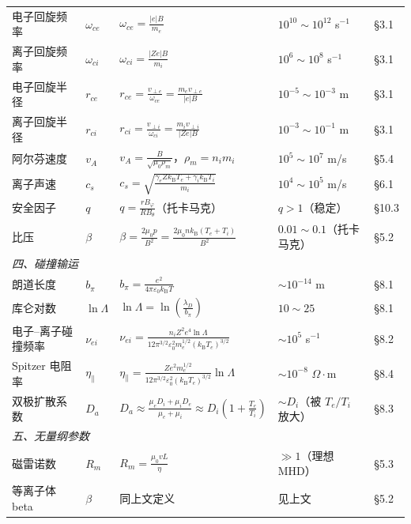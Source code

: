 \documentclass[12pt,a4paper,openany,oneside]{book}
\newcommand{\eps}{\varepsilon}
\begin{document}
{\begin{longtable}{@{}p{2.2cm}p{1.2cm}p{7.1cm}p{2.9cm}p{1.4cm}@{}}
\midrule
电子回旋频率 & $\omega_{ce}$ & $\displaystyle\omega_{ce} = \frac{|e|B}{m_e}$ & $10^{10}\sim10^{12}$ s$^{-1}$ & \S 3.1 \\
离子回旋频率 & $\omega_{ci}$ & $\displaystyle\omega_{ci} = \frac{|Ze|B}{m_i}$ & $10^{6}\sim10^{8}$ s$^{-1}$ & \S 3.1 \\
电子回旋半径 & $r_{ce}$ & $\displaystyle r_{ce} = \frac{v_{\perp e}}{\omega_{ce}} = \frac{m_e v_{\perp e}}{|e|B}$ & $10^{-5}\sim10^{-3}$ m & \S 3.1 \\
离子回旋半径 & $r_{ci}$ & $\displaystyle r_{ci} = \frac{v_{\perp i}}{\omega_{ci}} = \frac{m_i v_{\perp i}}{|Ze|B}$ & $10^{-3}\sim10^{-1}$ m & \S 3.1 \\
阿尔芬速度 & $v_A$ & $\displaystyle v_A = \frac{B}{\sqrt{\mu_0\rho_m}}$，$\rho_m=n_i m_i$ & $10^{5}\sim10^{7}$ m/s & \S 5.4 \\
离子声速 & $c_s$ & $\displaystyle c_s = \sqrt{\frac{\gamma_e Z k_\mathrm{B}T_e + \gamma_i k_\mathrm{B}T_i}{m_i}}$ & $10^{4}\sim10^{5}$ m/s & \S 6.1 \\
安全因子 & $q$ & $\displaystyle q = \frac{r B_\varphi}{R B_\theta}$（托卡马克）& $q>1$（稳定）& \S 10.3 \\
比压 & $\beta$ & $\displaystyle\beta = \frac{2\mu_0 p}{B^2} = \frac{2\mu_0 n k_\mathrm{B}(T_e+T_i)}{B^2}$ & $0.01\sim0.1$（托卡马克）& \S 5.2 \\
\midrule
\multicolumn{5}{l}{\textit{四、碰撞输运}} \\
\midrule
朗道长度 & $b_\pi$ & $\displaystyle b_\pi = \frac{e^2}{4\pi\eps_0 k_\mathrm{B}T}$ & $\sim 10^{-14}$ m & \S 8.1 \\
库仑对数 & $\ln\Lambda$ & $\displaystyle\ln\Lambda = \ln\!\left(\frac{\lambda_D}{b_\pi}\right)$ & $10\sim 25$ & \S 8.1 \\
电子--离子碰撞频率 & $\nu_{ei}$ & $\displaystyle\nu_{ei} = \frac{n_i Z^2 e^4\ln\Lambda}{12\pi^{3/2}\eps_0^2 m_e^{1/2}(k_\mathrm{B}T_e)^{3/2}}$ & $\sim 10^{5}$ s$^{-1}$ & \S 8.2 \\
Spitzer 电阻率 & $\eta_\parallel$ & $\displaystyle\eta_\parallel = \frac{Z e^2 m_e^{1/2}}{12\pi^{3/2}\eps_0^2(k_\mathrm{B}T_e)^{3/2}}\ln\Lambda$ & $\sim 10^{-8}$ $\Omega\cdot$m & \S 8.4 \\
双极扩散系数 & $D_a$ & $\displaystyle D_a \approx \frac{\mu_e D_i + \mu_i D_e}{\mu_e + \mu_i}\approx D_i\left(1+\frac{T_e}{T_i}\right)$ & $\sim D_i$（被 $T_e/T_i$ 放大）& \S 8.3 \\
\midrule
\multicolumn{5}{l}{\textit{五、无量纲参数}} \\
\midrule
磁雷诺数 & $R_m$ & $\displaystyle R_m = \frac{\mu_0 v L}{\eta}$ & $\gg 1$（理想 MHD）& \S 5.3 \\
等离子体 beta & $\beta$ & 同上文定义 & 见上文 & \S 5.2 \\
\end{longtable}
}
\end{document}

